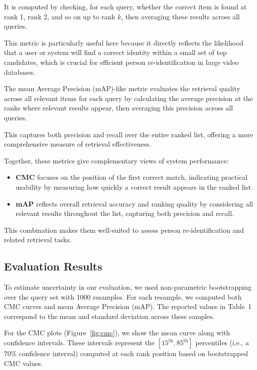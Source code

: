 \documentclass[fleqn,moreauthors,10pt]{ds_report}
\begin{document}
It is computed by checking, for each query, whether the correct item is found at rank 1, 
rank 2, and so on up to rank $k$, then averaging these results across all queries.

This metric is particularly useful here because it directly reflects 
the likelihood that a user or system will find a correct identity 
within a small set of top candidates, which is crucial for efficient person re-identification 
in large video databases.

The mean Average Precision (mAP)-like metric evaluates the retrieval quality 
across all relevant items for each query by calculating the average precision 
at the ranks where relevant results appear, then averaging this precision across all queries.

This captures both precision and recall over the entire ranked list, 
offering a more comprehensive measure of retrieval effectiveness.

Together, these metrics give complementary views of system performance:

\begin{itemize}
    \item \textbf{CMC} focuses on the position of the first correct match, indicating practical usability by measuring how quickly a correct result appears in the ranked list.
    \item \textbf{mAP} reflects overall retrieval accuracy and ranking quality by considering all relevant results throughout the list, capturing both precision and recall.
\end{itemize}

This combination makes them well-suited to assess person re-identification and related retrieval tasks.

\subsection*{Evaluation Results}
To estimate uncertainty in our evaluation, we used non-parametric bootstrapping over the query set with 1000 resamples. 
For each resample, we computed both CMC curves and mean Average Precision (mAP). 
The reported values in Table~1 correspond to the mean and standard deviation across these samples.

For the CMC plots (Figure~\ref{fig:cmc}), we show the mean curve along with confidence intervals.
These intervals represent the $[15^\text{th}, 85^\text{th}]$ percentiles (i.e., a 70\% confidence interval)
computed at each rank position based on bootstrapped CMC values.
\end{document}
